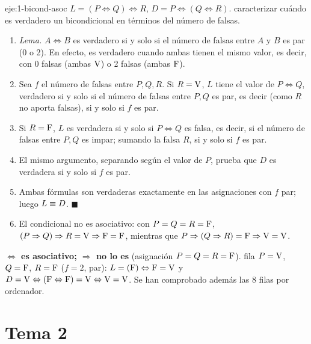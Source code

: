 \begin{solucion}{eje:1-bicond-asoc}
\datos $L=(P\Leftrightarrow Q)\Leftrightarrow R$, $D=P\Leftrightarrow(Q\Leftrightarrow R)$.
\planteamiento caracterizar cuándo es verdadero un bicondicional en términos del número de falsas.
\pasos
\begin{enumerate}[label=\arabic*.]
  \item \emph{Lema.} $A\Leftrightarrow B$ es verdadero si y solo si el número de falsas entre $A$ y $B$ es par (0 o 2). En efecto, es verdadero cuando ambas tienen el mismo valor, es decir, con 0 falsas (ambas $\mathrm{V}$) o 2 falsas (ambas $\mathrm{F}$).
  \item Sea $f$ el número de falsas entre $P,Q,R$. Si $R=\mathrm{V}$, $L$ tiene el valor de $P\Leftrightarrow Q$, verdadero si y solo si el número de falsas entre $P,Q$ es par, es decir (como $R$ no aporta falsas), si y solo si $f$ es par.
  \item Si $R=\mathrm{F}$, $L$ es verdadera si y solo si $P\Leftrightarrow Q$ es falsa, es decir, si el número de falsas entre $P,Q$ es impar; sumando la falsa $R$, si y solo si $f$ es par.
  \item El mismo argumento, separando según el valor de $P$, prueba que $D$ es verdadera si y solo si $f$ es par.
  \item Ambas fórmulas son verdaderas exactamente en las asignaciones con $f$ par; luego $L\equiv D$. $\blacksquare$
  \item El condicional no es asociativo: con $P=Q=R=\mathrm{F}$, $(P\Rightarrow Q)\Rightarrow R=\mathrm{V}\Rightarrow\mathrm{F}=\mathrm{F}$, mientras que $P\Rightarrow(Q\Rightarrow R)=\mathrm{F}\Rightarrow\mathrm{V}=\mathrm{V}$.
\end{enumerate}
\resultado \textbf{$\Leftrightarrow$ es asociativo; $\Rightarrow$ no lo es} (asignación $P=Q=R=\mathrm{F}$).
\comprobacion fila $P=\mathrm{V}$, $Q=\mathrm{F}$, $R=\mathrm{F}$ ($f=2$, par): $L=(\mathrm{F})\Leftrightarrow\mathrm{F}=\mathrm{V}$ y $D=\mathrm{V}\Leftrightarrow(\mathrm{F}\Leftrightarrow\mathrm{F})=\mathrm{V}\Leftrightarrow\mathrm{V}=\mathrm{V}$. Se han comprobado además las 8 filas por ordenador.
\end{solucion}

\section{Tema 2}

